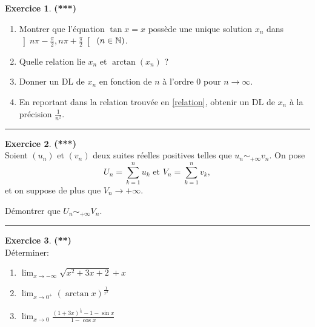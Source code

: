 \documentclass[a4paper,11pt]{article}
\theoremstyle{definition}
\newtheorem{exo}{Exercice} %
\begin{document}
\begin{minipage}{1\linewidth}
\begin{minipage}[t]{0.48\linewidth}
			
		
		\begin{exo}\textbf{(***)}\quad\\[0.2cm]
			
		\begin{enumerate}
			\item  Montrer que l'équation $\tan x = x$ possède une unique solution
			$x_n$ dans
			$\left]n\pi-\frac \pi2, n\pi+\frac \pi2\right[$ $(n\in \mathbb{N})$.
			\item  Quelle relation lie $x_n$ et $\arctan(x_n)$ ? \label{relation}
			\item  Donner un DL de $x_n$ en fonction de $n$ à l'ordre $0$ pour $n\to\infty$.
			\item  En reportant dans la relation trouvée en \ref{relation},
			obtenir un DL de $x_n$ à la précision $\frac{1}{n^2}$.
		\end{enumerate}
			
			
			\centering
			\rule{1\linewidth}{0.6pt}
		\end{exo}
	
	\begin{exo}\textbf{(***)}\quad\\[0.2cm]
		Soient $(u_n)$ et $(v_n)$ deux suites réelles positives telles que $u_n\sim_{+\infty}v_n$. On pose
		$$U_n=\sum_{k=1}^n u_k\textrm{ et }V_n=\sum_{k=1}^n v_k,$$
		et on suppose de plus que $V_n\to+\infty$.
		
		Démontrer que $U_n\sim_{+\infty} V_n.$
		
	
		
		
		\centering
		\rule{1\linewidth}{0.6pt}
	\end{exo}
		
		
		
	\end{minipage}	
	\hfill\vrule\hfill
	\begin{minipage}[t]{0.48\linewidth}
		\raggedright
		\begin{exo}\textbf{(**)}\quad\\[0.2cm]
			
			Déterminer:
			\begin{enumerate}
				\item $\displaystyle \lim _{x \rightarrow -\infty} \sqrt{x^2+3x+2} +x$
				
				\item $\displaystyle \lim _{x \rightarrow 0^+}(\arctan x)^{\frac{1}{x^2}}$
				
				\item $\displaystyle \lim _{x \rightarrow 0} \frac{(1+3x)^{\frac{1}{3}}-1-\sin x}{1-\cos x}$
			\end{enumerate}
			

\end{exo}
\end{minipage}
\end{minipage}
\end{document}

